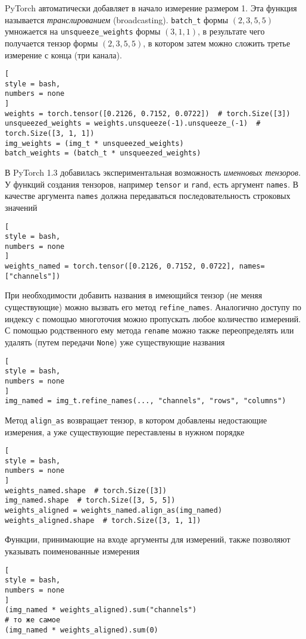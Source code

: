 \documentclass[%
	11pt,
	a4paper,
	utf8,
		]{article}
\begin{document}
PyTorch автоматически добавляет в начало измерение размером 1. Эта функция называется \emph{транслированием} (broadcasting). \verb|batch_t| формы $(2, 3, 5, 5)$ умножается на \verb|unsqueeze_weights| формы $(3, 1, 1)$, в результате чего получается тензор формы $(2, 3, 5, 5)$, в котором затем можно сложить третье измерение с конца (три канала).
\begin{lstlisting}[
style = bash,
numbers = none
]
weights = torch.tensor([0.2126, 0.7152, 0.0722])  # torch.Size([3])
unsqueezed_weights = weights.unsqueeze(-1).unsqueeze_(-1)  # torch.Size([3, 1, 1])
img_weights = (img_t * unsqueezed_weights)
batch_weights = (batch_t * unsqueezed_weights)
\end{lstlisting}

В PyTorch 1.3 добавилась экспериментальная возможность \emph{именновых тензоров}. У функций создания тензоров, например \verb|tensor| и \verb|rand|, есть аргумент \verb|names|. В качестве аргумента \verb|names| должна передаваться последовательность строковых значений
\begin{lstlisting}[
style = bash,
numbers = none
]
weights_named = torch.tensor([0.2126, 0.7152, 0.0722], names=["channels"])
\end{lstlisting}

При необходимости добавить названия в имеющийся тензор (не меняя существующие) можно вызвать его метод \verb|refine_names|. Аналогично доступу по индексу с помощью многоточия можно пропускать любое количество измерений. С помощью родственного ему метода \verb|rename| можно также переопределять или удалять (путем передачи \verb|None|) уже существующие названия
\begin{lstlisting}[
style = bash,
numbers = none
]
img_named = img_t.refine_names(..., "channels", "rows", "columns")
\end{lstlisting}

Метод \verb|align_as| возвращает тензор, в котором добавлены недостающие измерения, а уже существующие переставлены в нужном порядке \cite[]{pytorch-2022}
\begin{lstlisting}[
style = bash,
numbers = none
]
weights_named.shape  # torch.Size([3])
img_named.shape  # torch.Size([3, 5, 5])
weights_aligned = weights_named.align_as(img_named)
weights_aligned.shape  # torch.Size([3, 1, 1])
\end{lstlisting}

Функции, принимающие на входе аргументы для измерений, также позволяют указывать поименованные измерения
\begin{lstlisting}[
style = bash,
numbers = none
]
(img_named * weights_aligned).sum("channels")
# то же самое
(img_named * weights_aligned).sum(0)
\end{lstlisting}
\end{document}
